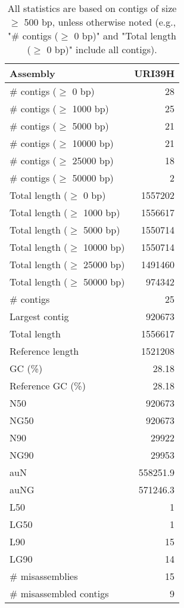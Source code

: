 \documentclass[12pt,a4paper]{article}
\begin{document}
\begin{table}[ht]
\begin{center}
\caption{All statistics are based on contigs of size $\geq$ 500 bp, unless otherwise noted (e.g., "\# contigs ($\geq$ 0 bp)" and "Total length ($\geq$ 0 bp)" include all contigs).}
\begin{tabular}{|l*{1}{|r}|}
\hline
Assembly & URI39H \\ \hline
\# contigs ($\geq$ 0 bp) & 28 \\ \hline
\# contigs ($\geq$ 1000 bp) & 25 \\ \hline
\# contigs ($\geq$ 5000 bp) & 21 \\ \hline
\# contigs ($\geq$ 10000 bp) & 21 \\ \hline
\# contigs ($\geq$ 25000 bp) & 18 \\ \hline
\# contigs ($\geq$ 50000 bp) & 2 \\ \hline
Total length ($\geq$ 0 bp) & 1557202 \\ \hline
Total length ($\geq$ 1000 bp) & 1556617 \\ \hline
Total length ($\geq$ 5000 bp) & 1550714 \\ \hline
Total length ($\geq$ 10000 bp) & 1550714 \\ \hline
Total length ($\geq$ 25000 bp) & 1491460 \\ \hline
Total length ($\geq$ 50000 bp) & 974342 \\ \hline
\# contigs & 25 \\ \hline
Largest contig & 920673 \\ \hline
Total length & 1556617 \\ \hline
Reference length & 1521208 \\ \hline
GC (\%) & 28.18 \\ \hline
Reference GC (\%) & 28.18 \\ \hline
N50 & 920673 \\ \hline
NG50 & 920673 \\ \hline
N90 & 29922 \\ \hline
NG90 & 29953 \\ \hline
auN & 558251.9 \\ \hline
auNG & 571246.3 \\ \hline
L50 & 1 \\ \hline
LG50 & 1 \\ \hline
L90 & 15 \\ \hline
LG90 & 14 \\ \hline
\# misassemblies & 15 \\ \hline
\# misassembled contigs & 9 \\ \hline

\end{tabular}
\end{center}
\end{table}
\end{document}

